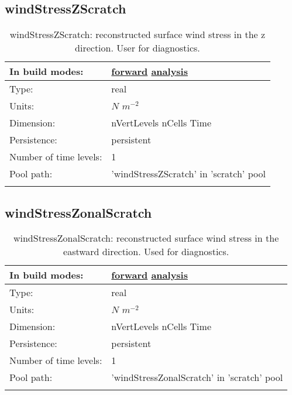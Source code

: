 \subsection[windStressZScratch]{windStressZScratch}
\label{subsec:var_sec_scratch_windStressZScratch}
\begin{center}
\begin{longtable}{| p{2.0in} | p{4.0in} |}
        \hline 
        In build modes: & \hyperref[subsec:forward_var_tab_scratch]{forward} \hyperref[subsec:analysis_var_tab_scratch]{analysis} \\
        \hline 
        Type: & real \\
        \hline 
        Units: & $N$ $m^{-2}$ \\
        \hline 
        Dimension: & nVertLevels nCells Time \\
        \hline 
        Persistence: & persistent \\
        \hline 
        Number of time levels: & 1 \\
        \hline 
            Pool path: & 'windStressZScratch' in 'scratch' pool
 \\
		 \hline 
    \caption{windStressZScratch: reconstructed surface wind stress in the z direction. User for diagnostics.}
\end{longtable}
\end{center}
\subsection[windStressZonalScratch]{windStressZonalScratch}
\label{subsec:var_sec_scratch_windStressZonalScratch}
\begin{center}
\begin{longtable}{| p{2.0in} | p{4.0in} |}
        \hline 
        In build modes: & \hyperref[subsec:forward_var_tab_scratch]{forward} \hyperref[subsec:analysis_var_tab_scratch]{analysis} \\
        \hline 
        Type: & real \\
        \hline 
        Units: & $N$ $m^{-2}$ \\
        \hline 
        Dimension: & nVertLevels nCells Time \\
        \hline 
        Persistence: & persistent \\
        \hline 
        Number of time levels: & 1 \\
        \hline 
            Pool path: & 'windStressZonalScratch' in 'scratch' pool
 \\
		 \hline 
    \caption{windStressZonalScratch: reconstructed surface wind stress in the eastward direction. Used for diagnostics.}
\end{longtable}
\end{center}
